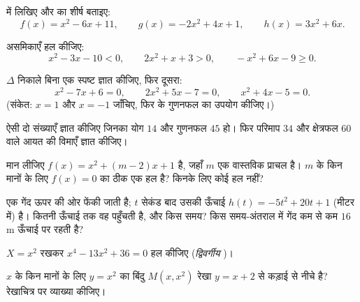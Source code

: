 \begin{exercise}[$\star$]\label{exo:g11:quad:2}
 में लिखिए और  का शीर्ष बताइए:
\[
f(x) = x^2 - 6x + 11, \qquad
g(x) = -2x^2 + 4x + 1, \qquad
h(x) = 3x^2 + 6x .
\]
\end{exercise}

\begin{exercise}[$\star$]\label{exo:g11:quad:3}
असमिकाएँ हल कीजिए:
\[
x^2 - 3x - 10 < 0, \qquad
2x^2 + x + 3 > 0, \qquad
-x^2 + 6x - 9 \geq 0 .
\]
\end{exercise}

\begin{exercise}[$\star$]\label{exo:g11:quad:4}
$\Delta$ निकाले बिना एक स्पष्ट  ज्ञात कीजिए, फिर दूसरा:
\[
x^2 - 7x + 6 = 0, \qquad
2x^2 + 5x - 7 = 0, \qquad
x^2 + 4x - 5 = 0 .
\]
(संकेत: $x = 1$ और $x = -1$ जाँचिए, फिर  के गुणनफल का उपयोग कीजिए।)
\end{exercise}

\begin{exercise}[$\star\star$]\label{exo:g11:quad:5}
ऐसी दो संख्याएँ ज्ञात कीजिए जिनका योग $14$ और गुणनफल $45$ हो। फिर परिमाप
$34$ और क्षेत्रफल $60$ वाले आयत की विमाएँ ज्ञात कीजिए।
\end{exercise}

\begin{exercise}[$\star\star$]\label{exo:g11:quad:6}
मान लीजिए $f(x) = x^2 + (m-2)x + 1$ है, जहाँ $m$ एक वास्तविक प्राचल है। $m$ के किन मानों के
लिए  $f(x) = 0$ का ठीक एक हल है? किनके लिए कोई हल नहीं?
\end{exercise}

\begin{exercise}[$\star\star$]\label{exo:g11:quad:7}
एक गेंद ऊपर की ओर फेंकी जाती है; $t$ सेकंड बाद उसकी ऊँचाई $h(t) = -5t^2 + 20t + 1$ (मीटर में)
है।  कितनी ऊँचाई तक वह पहुँचती है, और किस समय? किस समय-अंतराल में गेंद
कम से कम $16$ m ऊँचाई पर रहती है?
\end{exercise}

\begin{exercise}[$\star\star$]\label{exo:g11:quad:8}
$X = x^2$ रखकर  $x^4 - 13x^2 + 36 = 0$ हल कीजिए (\emph{द्विवर्गीय} )।
\end{exercise}

\begin{exercise}[$\star\star$]\label{exo:g11:quad:9}
$x$ के किन मानों के लिए  $y = x^2$ का बिंदु $M(x, x^2)$ रेखा $y = x + 2$ से कड़ाई से
नीचे है? रेखाचित्र पर व्याख्या कीजिए।
\end{exercise}

